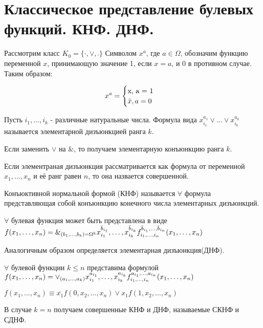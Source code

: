 \section {Классическое представление булевых функций. КНФ. ДНФ.}

Рассмотрим класс $K_0 = \{ \cdot , \vee , \bar{ }\}$
Символом $x^a$, где $a \in \Omega $, обозначим функцию переменной $x$, принимающую значение 1, если $x = a$, и 0 в противном случае. Таким образом:
\begin{center}
	\begin{equation*}
		x^a =
		\begin{cases}
   			$x, a = 1$
			\\
			\bar{x},a = 0
 		\end{cases}
	\end{equation*}
\end{center}

\opr
Пусть $i_1, \dotsc, i_k$ - различные натуральные числа. Формула вида $x_{i_1}^{a_1} \vee \dotsc \vee x_{i_k}^{a_k}$ называется элементарной дизъюнкцией ранга $k$.\par Если заменить $\vee$ на $\&$, то получаем элементарную конъюнкцию ранга $k$. \par Если элементраная дизъюнкция рассматривается как формула от переменной $x_1, \dotsc,x_n$ и её ранг равен $n$, то она назвается совершенной.

\opr Конъюктивной нормальной формой (КНФ) называется $\forall$ формула представляющая собой конъюнкцию конечного числа элементарных дизъюнкций.

\thr $\forall$ булевая функция может быть представлена в виде $f(x_1, \dotsc, x_n) = \Large\&\normalsize_{(b_1, \dotsc, b_k) = \Omega^k} x_{i_1}^{\bar{b}_{i_1}},\dotsc,x_{i_k}^{\bar{b}_{i_k}}f_{i_1, \dotsc, i_n}^{\bar{b}_{i_1},\dotsc,\bar{b}_{i_n}}(x_1,\dotsc,x_n)$ %

\note Аналогичным образом определяется элементарная дизъюнкция(ДНФ).

\thr $\forall$ булевой функции $k\leq n$ представима формулой $f(x_1,\dotsc,x_n) = \Large\vee\normalsize_{(a_1, \dotsc, a_k)} x_{i_1}^{a_{i_1}},\dotsc,x_{i_k}^{a_{i_k}}f_{i_1, \dotsc, i_n}^{a_{i_1},\dotsc,a_{i_n}}(x_1,\dotsc,x_n)$ %

\conseq $f(x_1,\dotsc,x_n) \equiv \overline{x_1}f(0,x_2,\dotsc,x_n) \vee x_1f(1, x_2, \dotsc, x_n)$

В случае $k = n$ получаем совершенные КНФ и ДНФ, называемые СКНФ и СДНФ.

